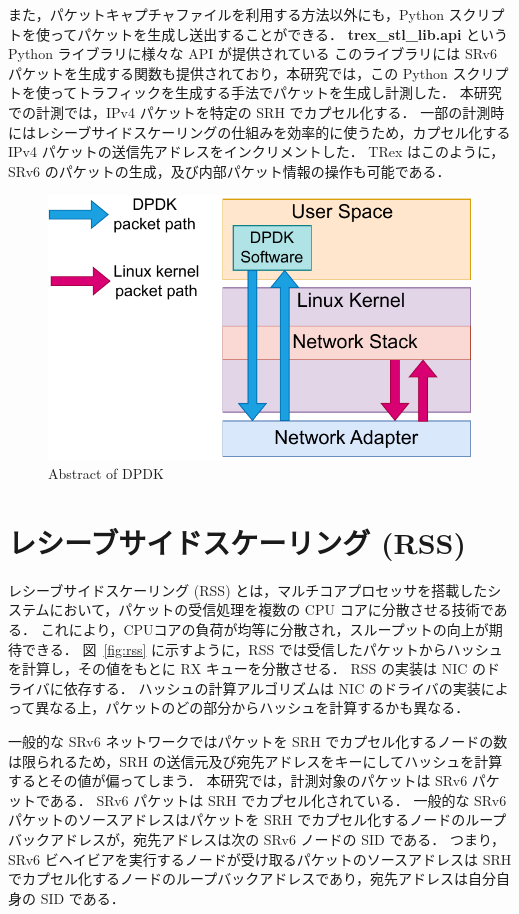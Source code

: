 また，パケットキャプチャファイルを利用する方法以外にも，Python スクリプトを使ってパケットを生成し送出することができる．
\textbf{trex\_stl\_lib.api} という Python ライブラリに様々な API が提供されている
このライブラリには SRv6 パケットを生成する関数も提供されており，本研究では，この Python スクリプトを使ってトラフィックを生成する手法でパケットを生成し計測した．
本研究での計測では，IPv4 パケットを特定の SRH でカプセル化する．
一部の計測時にはレシーブサイドスケーリングの仕組みを効率的に使うため，カプセル化する IPv4 パケットの送信先アドレスをインクリメントした．
TRex はこのように，SRv6 のパケットの生成，及び内部パケット情報の操作も可能である．

\begin{figure}[t]
    \centering
    \includegraphics[width=0.95\linewidth]{img/DPDK.pdf}
    \caption{Abstract of DPDK}
    \label{fig:dpdk}
\end{figure}

\section{レシーブサイドスケーリング (RSS)}
\label{sec:rss}
レシーブサイドスケーリング (RSS) とは，マルチコアプロセッサを搭載したシステムにおいて，パケットの受信処理を複数の CPU コアに分散させる技術である．
これにより，CPUコアの負荷が均等に分散され，スループットの向上が期待できる．
図~\ref*{fig:rss} に示すように，RSS では受信したパケットからハッシュを計算し，その値をもとに RX キューを分散させる．
RSS の実装は NIC のドライバに依存する．
ハッシュの計算アルゴリズムは NIC のドライバの実装によって異なる上，パケットのどの部分からハッシュを計算するかも異なる．

一般的な SRv6 ネットワークではパケットを SRH でカプセル化するノードの数は限られるため，SRH の送信元及び宛先アドレスをキーにしてハッシュを計算するとその値が偏ってしまう．
本研究では，計測対象のパケットは SRv6 パケットである．
SRv6 パケットは SRH でカプセル化されている．
一般的な SRv6 パケットのソースアドレスはパケットを SRH でカプセル化するノードのループバックアドレスが，宛先アドレスは次の SRv6 ノードの SID である．
つまり，SRv6 ビヘイビアを実行するノードが受け取るパケットのソースアドレスは SRH でカプセル化するノードのループバックアドレスであり，宛先アドレスは自分自身の SID である．

